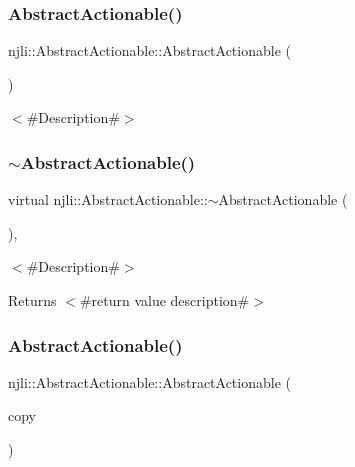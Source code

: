 \subsubsection{\texorpdfstring{Abstract\+Actionable()}{AbstractActionable()}\hspace{0.1cm}{\footnotesize\ttfamily [1/2]}}
{\footnotesize\ttfamily njli\+::\+Abstract\+Actionable\+::\+Abstract\+Actionable (\begin{DoxyParamCaption}{ }\end{DoxyParamCaption})\hspace{0.3cm}{\ttfamily [protected]}}

$<$\#\+Description\#$>$ \mbox{\label{classnjli_1_1_abstract_actionable_a649739eb41be60afdcf18d7fe0d25fff}} 
\subsubsection{\texorpdfstring{$\sim$\+Abstract\+Actionable()}{~AbstractActionable()}}
{\footnotesize\ttfamily virtual njli\+::\+Abstract\+Actionable\+::$\sim$\+Abstract\+Actionable (\begin{DoxyParamCaption}{ }\end{DoxyParamCaption})\hspace{0.3cm}{\ttfamily [protected]}, {\ttfamily [virtual]}}

$<$\#\+Description\#$>$

\begin{DoxyReturn}{Returns}
$<$\#return value description\#$>$ 
\end{DoxyReturn}
\mbox{\label{classnjli_1_1_abstract_actionable_a7674886976b87af3bfa33ad030268e3e}} 
\subsubsection{\texorpdfstring{Abstract\+Actionable()}{AbstractActionable()}\hspace{0.1cm}{\footnotesize\ttfamily [2/2]}}
{\footnotesize\ttfamily njli\+::\+Abstract\+Actionable\+::\+Abstract\+Actionable (\begin{DoxyParamCaption}\item[{const \mbox{\hyperlink{classnjli_1_1_abstract_actionable}{Abstract\+Actionable}} \&}]{copy }\end{DoxyParamCaption})\hspace{0.3cm}{\ttfamily [private]}}



